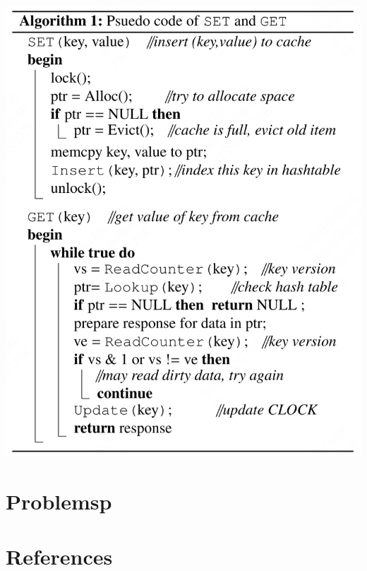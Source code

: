 \documentclass[11pt]{article}
\begin{document}
\begin{center}
\includegraphics[width=.7\textwidth]{../../images/papers/177.png}
\label{a1}
\end{center}
\section{Problemsp}
\label{sec:org9a3e213}


\section{References}
\label{sec:org4453499}
\label{bibliographystyle link}



\end{document}
